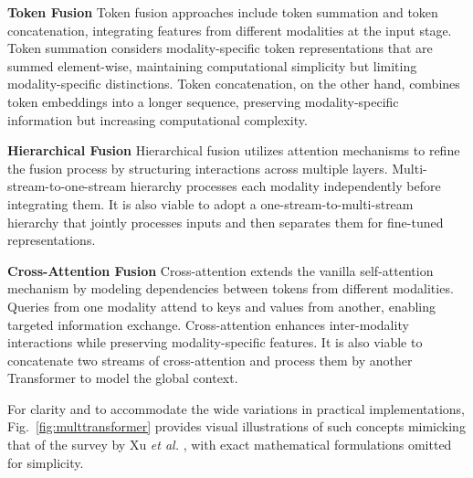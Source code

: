 \documentclass[journal]{IEEEtran}
\begin{document}
\textbf{Token Fusion} Token fusion approaches include token summation and token concatenation, integrating features from different modalities at the input stage. Token summation considers modality-specific token representations that are summed element-wise, maintaining computational simplicity but limiting modality-specific distinctions. Token concatenation, on the other hand, combines token embeddings into a longer sequence, preserving modality-specific information but increasing computational complexity.

\textbf{Hierarchical Fusion} Hierarchical fusion utilizes attention mechanisms to refine the fusion process by structuring interactions across multiple layers. Multi-stream-to-one-stream hierarchy processes each modality independently before integrating them. It is also viable to adopt a one-stream-to-multi-stream hierarchy that jointly processes inputs and then separates them for fine-tuned representations.

\textbf{Cross-Attention Fusion} Cross-attention extends the vanilla self-attention mechanism by modeling dependencies between tokens from different modalities. Queries from one modality attend to keys and values from another, enabling targeted information exchange. Cross-attention enhances inter-modality interactions while preserving modality-specific features. It is also viable to concatenate two streams of cross-attention and process them by another Transformer to model the global context.

For clarity and to accommodate the wide variations in practical implementations, Fig.~\ref{fig:multtransformer} provides visual illustrations of such concepts mimicking that of the survey by Xu \emph{et al.} \cite{Xu2023}, with exact mathematical formulations omitted for simplicity.

\begin{figure*}[htpb]
\centering
{}
\caption{Variants of multimodal Transformers mechanisms that enable multimodal fusion. (a) Token summation and token concatenation; (b) Multi-stream-to-one-stream hierarchy and one-stream-to-multi-stream hierarchy; and (c) Cross-attention and cross-attention to concatenation. Q, K, and V stand for query, key, and value of attention mechanism. Blue and red blocks stand for tokens for two input modalities.} \label{fig:multtransformer}
\end{figure*}
\end{document}
